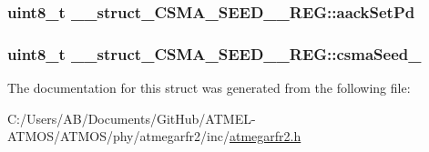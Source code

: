 \hypertarget{struct____struct___c_s_m_a___s_e_e_d__1___r_e_g_a49c60b8e44dbae4ea80f68446c12398b}{
\subsubsection[{aack\-Set\-Pd}]{\setlength{\rightskip}{0pt plus 5cm}uint8\-\_\-t \-\_\-\-\_\-struct\-\_\-\-C\-S\-M\-A\-\_\-\-S\-E\-E\-D\-\_\-\_\-\-R\-E\-G\-::aack\-Set\-Pd}}\label{struct____struct___c_s_m_a___s_e_e_d__1___r_e_g_a49c60b8e44dbae4ea80f68446c12398b}
\hypertarget{struct____struct___c_s_m_a___s_e_e_d__1___r_e_g_a0ec3afb08beac54bb8fe108b94662e30}{
\subsubsection[{csma\-Seed\-\_\-1}]{\setlength{\rightskip}{0pt plus 5cm}uint8\-\_\-t \-\_\-\-\_\-struct\-\_\-\-C\-S\-M\-A\-\_\-\-S\-E\-E\-D\-\_\-\_\-\-R\-E\-G\-::csma\-Seed\-\_}}\label{struct____struct___c_s_m_a___s_e_e_d__1___r_e_g_a0ec3afb08beac54bb8fe108b94662e30}


The documentation for this struct was generated from the following file\-:\begin{DoxyCompactItemize}
\item 
C\-:/\-Users/\-A\-B/\-Documents/\-Git\-Hub/\-A\-T\-M\-E\-L-\/\-A\-T\-M\-O\-S/\-A\-T\-M\-O\-S/phy/atmegarfr2/inc/\hyperlink{atmegarfr2_8h}{atmegarfr2.\-h}\end{DoxyCompactItemize}
